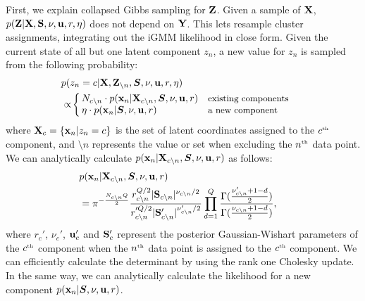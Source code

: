 First, we explain collapsed Gibbs sampling for $\mathbf{Z}$.
Given a sample of $\mathbf{X}$, $p(\mathbf{Z}|\mathbf{X},\mathbf{S},\nu,{\bf{u}},r,\eta)$ does not depend on $\mathbf{Y}$.  This lets resample cluster assignments, integrating out the iGMM likelihood in close form.
Given the current state of all but one latent component $z_{n}$, a new value for $z_{n}$ is sampled from the following probability:
\begin{align}
\lefteqn{p(z_{n}=c|\vX,\vZ_{\setminus n},\bm{S},\nu,\vu,r,\eta)}
\nonumber \\
&\propto\!
\left\{
\begin{array}{ll}
\!\!N_{c\setminus n}\cdot p(\vx_{n}|\vX_{c\setminus n},\bm{S},\nu,\vu,r) & \text{{\small existing components}}\\
\!\!\eta\cdot p(\vx_{n}|\bm{S},\nu,\vu,r) & \text{{\small a new component}}
\end{array}
\right.
\label{eq:gibbs}
\end{align}
where $\mathbf{X}_{c}=\{{\bf{x}}_{n}|z_{n}=c\}$ 
is the set of latent coordinates assigned to the $c^{\text{\tiny th}}$ component,
and $\setminus n$ represents the value or set
when excluding the $n^{\text{\tiny th}}$ data point.
We can analytically calculate $p({\bf{x}}_{n}|\mathbf{X}_{c\setminus n},\bm{S},\nu,{\bf{u}},r)$
as follows:
\begin{align}
\lefteqn{p(\vx_{n}|\vX_{c\setminus n},\bm{S},\nu,\vu,r)}
\nonumber \\
&=\pi^{-\frac{N_{c\setminus n}Q}{2}}\frac{r_{c\setminus n}^{Q/2}|\vS_{c\setminus n}|^{\nu_{c\setminus n}/2}}{r_{c\setminus n}'^{Q/2}|\vS_{c\setminus n}'|^{\nu_{c\setminus n}'/2}}\prod_{d=1}^{Q}\frac{\Gamma(\frac{\nu_{c\setminus n}'+1-d}{2})}{\Gamma(\frac{\nu_{c\setminus n}+1-d}{2})},
\end{align}
where 
$r_{c}'$, $\nu_{c}'$, ${\bf{u}}_{c}'$ and $\mathbf{S}_{c}'$
represent the posterior Gaussian-Wishart parameters of the $c^{\text{\tiny th}}$ component
when the $n^{\text{\tiny th}}$ data point is assigned to the $c^{\text{\tiny th}}$ component.
We can efficiently calculate the determinant by using the
rank one Cholesky update.
In the same way, we can analytically calculate 
the likelihood for a new component $p({\bf{x}}_{n}|\bm{S},\nu,{\bf{u}},r)$.

